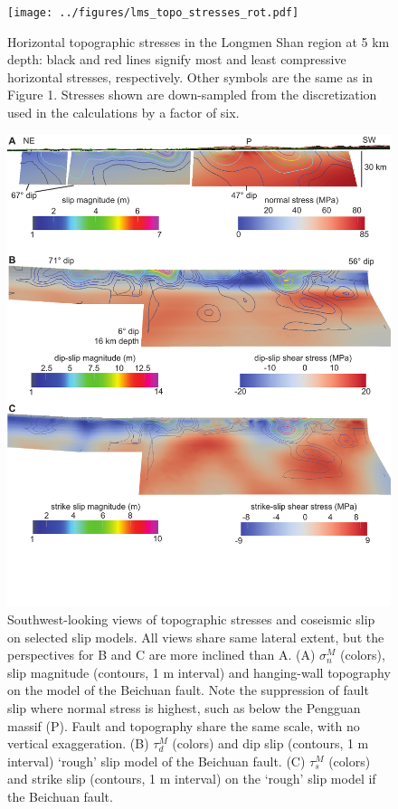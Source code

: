 \documentclass[draft,jgrga]{AGUTeX}
\begin{document}
\begin{figure}[t]
\centering
\texttt{[image: ../figures/lms\_topo\_stresses\_rot.pdf]}
\caption{Horizontal topographic stresses in the Longmen Shan region at 5
km depth: black and red lines signify most and least compressive
horizontal stresses, respectively. Other symbols are the same as in Figure
1. Stresses shown are down-sampled from the
discretization used in the calculations by a factor of six.}
\label{fig:lms_topo_stresses_rot}
\end{figure}

\begin{figure}[htbp]
\centering
\includegraphics[width=40pc]{../figures/fault_stress_3d.pdf}
\caption{Southwest-looking views of topographic stresses and coseismic
slip on selected slip models. All views share same lateral extent, but
the perspectives for B and C are more inclined than A. (A) $\sigma_n^M$
(colors), slip magnitude (contours, 1 m interval) and hanging-wall
topography on the \citet{feng2010} model of the Beichuan
fault. Note the suppression of fault slip where normal stress is
highest, such as below the Pengguan massif (P). Fault and topography
share the same scale, with no vertical exaggeration. (B) $\tau_d^M$ (colors)
and dip slip (contours, 1 m interval) \citet{qi2011}
`rough' slip model of the Beichuan fault. (C) $\tau_s^M$ (colors) and strike
slip (contours, 1
m interval) on the \citet{qi2011} `rough' slip model if the Beichuan fault.}
\label{fig:fault_stress_3d}
\end{figure}
\end{document}
